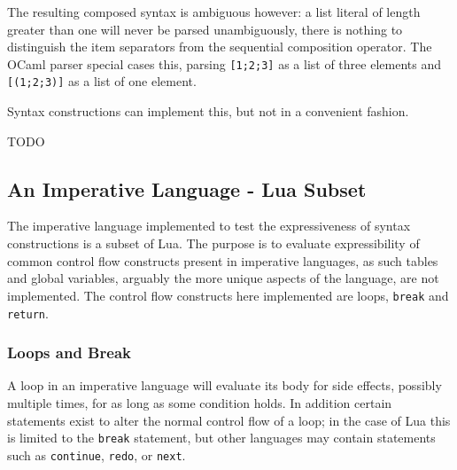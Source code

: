 \documentclass{kththesis}
\begin{document}
The resulting composed syntax is ambiguous however: a list literal of length greater than one will never be parsed unambiguously, there is nothing to distinguish the item separators from the sequential composition operator. The OCaml parser special cases this, parsing \texttt{[1;2;3]} as a list of three elements and \texttt{[(1;2;3)]} as a list of one element.

Syntax constructions can implement this, but not in a convenient fashion.

TODO




\subsection{An Imperative Language - Lua Subset} \label{sec:imperative-eval}

The imperative language implemented to test the expressiveness of syntax constructions is a subset of Lua. %
The purpose is to evaluate expressibility of common control flow constructs present in imperative languages, as such tables and global variables, arguably the more unique aspects of the language, are not implemented. The control flow constructs here implemented are loops, \texttt{break} and \texttt{return}.

\subsubsection{Loops and Break} \label{sec:lua-loops-and-break}

A loop in an imperative language will evaluate its body for side effects, possibly multiple times, for as long as some condition holds. In addition certain statements exist to alter the normal control flow of a loop; in the case of Lua this is limited to the \texttt{break} statement, but other languages may contain statements such as \texttt{continue}, \texttt{redo}, or \texttt{next}.
\end{document}
